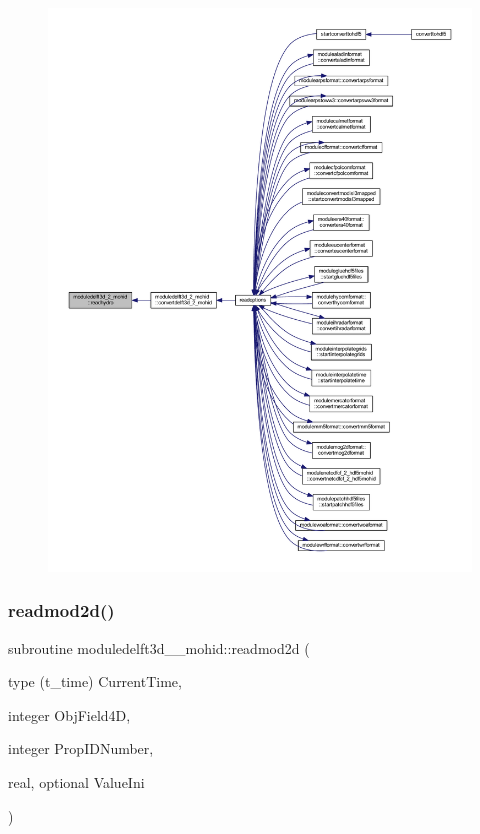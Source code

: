 \begin{figure}[H]
\begin{center}
\leavevmode
\includegraphics[width=350pt]{namespacemoduledelft3d__2__mohid_a04640ef3827cfdf73681b2b4ed0f3884_icgraph}
\end{center}
\end{figure}
\mbox{\label{namespacemoduledelft3d__2__mohid_a677f5946463bc1873841fd2e4a910617}} 
\subsubsection{\texorpdfstring{readmod2d()}{readmod2d()}}
{\footnotesize\ttfamily subroutine moduledelft3d\+\_\+\_\+mohid\+::readmod2d (\begin{DoxyParamCaption}\item[{type (t\+\_\+time)}]{Current\+Time,  }\item[{integer}]{Obj\+Field4D,  }\item[{integer}]{Prop\+I\+D\+Number,  }\item[{real, optional}]{Value\+Ini }\end{DoxyParamCaption})\hspace{0.3cm}{\ttfamily [private]}}

